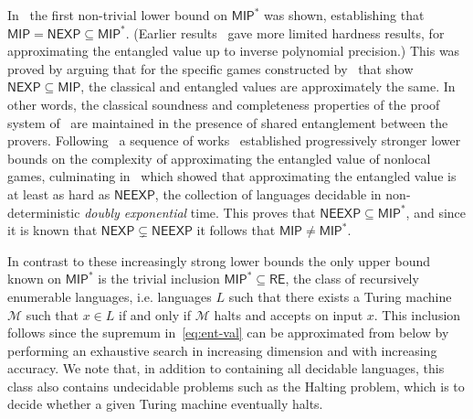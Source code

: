\documentclass[11pt]{article}
\theoremstyle{definition}
\newcommand{\cM}{\ensuremath{\mathcal{M}}}
\newcommand{\val}{\ensuremath{\mathrm{val}}}
\newcommand{\class}[1]{\ensuremath{\mathsf{#1}}\xspace}
\newcommand{\NEXP}{\class{NEXP}} %
\newcommand{\MIP}{\class{MIP}} %
\newcommand{\RE}{\class{RE}} %
\newcommand{\NEEXP}{\class{NEEXP}} %
\newcommand{\tnote}[1]{}
\newcommand{\hnote}[1]{}
\begin{document}
In~\cite{ito2012multi} the first non-trivial lower bound on $\MIP^*$ was shown, establishing that $\MIP = \NEXP \subseteq \MIP^*$. (Earlier results~\cite{kempe2011entangled,ito2009oracularization} gave more limited hardness results, for approximating the entangled value up to inverse polynomial precision.) This was proved by arguing that for the specific games constructed by~\cite{babai1991non} that show $\NEXP \subseteq \MIP$, the classical and entangled values are approximately the same. In other words, the classical soundness and completeness properties of the proof system of~\cite{babai1991non} are maintained in the presence of shared entanglement between the provers. 
Following~\cite{ito2012multi} a sequence of works~\cite{vidick2016three,ji2016classical,natarajan2018two,ji2017compression,natarajan2018low,fitzsimons2018quantum} established progressively stronger lower bounds on the complexity of approximating the entangled value of nonlocal games, culminating in~\cite{NW19} which showed that approximating the entangled value is at least as hard as $\NEEXP$, the collection of languages decidable in non-deterministic \emph{doubly exponential} time. This proves that $\NEEXP \subseteq \MIP^*$, and since it is known that $\NEXP\subsetneq \NEEXP$ it follows that $\MIP \neq \MIP^*$.





In contrast to these increasingly strong lower bounds the only upper bound known on $\MIP^*$ is the trivial inclusion $\MIP^* \subseteq \RE$, the class of recursively enumerable languages, i.e. languages $L$ such that there exists a Turing machine $\cM$ such that $x\in L$ if and only if $\cM$ halts and accepts on input $x$. This inclusion follows since the supremum in~\eqref{eq:ent-val} can be approximated from below by performing an exhaustive search in increasing dimension and with increasing accuracy. We note that, in addition to containing all decidable languages, this class also contains undecidable problems such as the Halting problem, which is to decide whether a given Turing machine eventually halts.
\end{document}
